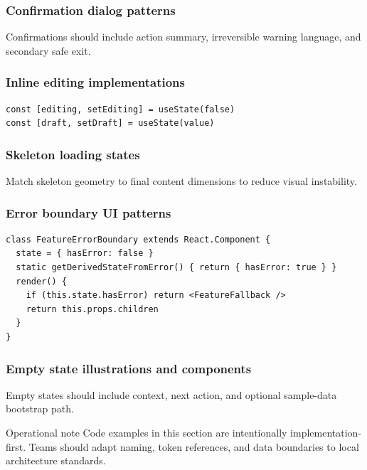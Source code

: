 \subsubsection{Confirmation dialog patterns}
Confirmations should include action summary, irreversible warning language, and secondary safe exit.

\subsubsection{Inline editing implementations}
\begin{verbatim}
const [editing, setEditing] = useState(false)
const [draft, setDraft] = useState(value)
\end{verbatim}

\subsubsection{Skeleton loading states}
Match skeleton geometry to final content dimensions to reduce visual instability.

\subsubsection{Error boundary UI patterns}
\begin{verbatim}
class FeatureErrorBoundary extends React.Component {
  state = { hasError: false }
  static getDerivedStateFromError() { return { hasError: true } }
  render() {
    if (this.state.hasError) return <FeatureFallback />
    return this.props.children
  }
}
\end{verbatim}

\subsubsection{Empty state illustrations and components}
Empty states should include context, next action, and optional sample-data bootstrap path.

\begin{highlightbox}{Operational note}
Code examples in this section are intentionally implementation-first. Teams should adapt naming, token references, and data boundaries to local architecture standards.
\end{highlightbox}
















